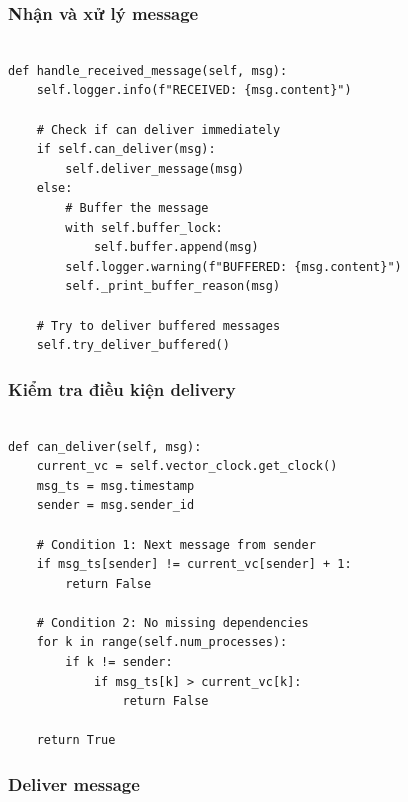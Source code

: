 \subsubsection{Nhận và xử lý message}

\begin{listing}[H]
\begin{verbatim}

def handle_received_message(self, msg):
    self.logger.info(f"RECEIVED: {msg.content}")
    
    # Check if can deliver immediately
    if self.can_deliver(msg):
        self.deliver_message(msg)
    else:
        # Buffer the message
        with self.buffer_lock:
            self.buffer.append(msg)
        self.logger.warning(f"BUFFERED: {msg.content}")
        self._print_buffer_reason(msg)
    
    # Try to deliver buffered messages
    self.try_deliver_buffered()
\end{verbatim}
\caption{Receive Message Implementation}
\end{listing}

\subsubsection{Kiểm tra điều kiện delivery}

\begin{listing}[H]
\begin{verbatim}

def can_deliver(self, msg):
    current_vc = self.vector_clock.get_clock()
    msg_ts = msg.timestamp
    sender = msg.sender_id
    
    # Condition 1: Next message from sender
    if msg_ts[sender] != current_vc[sender] + 1:
        return False
    
    # Condition 2: No missing dependencies
    for k in range(self.num_processes):
        if k != sender:
            if msg_ts[k] > current_vc[k]:
                return False
    
    return True
\end{verbatim}
\caption{Check Delivery Condition}
\end{listing}

\subsubsection{Deliver message}

